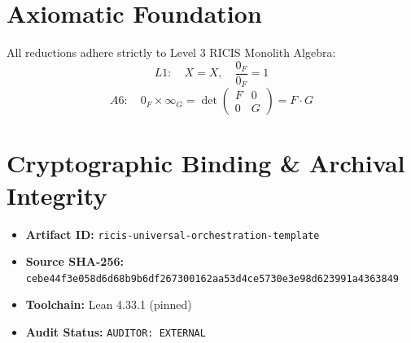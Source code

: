 \documentclass[11pt,a4paper]{article}
\begin{document}
\section{Axiomatic Foundation}
All reductions adhere strictly to Level 3 RICIS Monolith Algebra:
\begin{equation}
L1: \quad X = X, \quad \frac{0_F}{0_F} = 1
\end{equation}
\begin{equation}
A6: \quad 0_F \times \infty_G = \det\begin{pmatrix} F & 0 \\ 0 & G \end{pmatrix} = F \cdot G
\end{equation}

\section{Cryptographic Binding & Archival Integrity}
\begin{itemize}
  \item \textbf{Artifact ID:} \texttt{ricis-universal-orchestration-template}
  \item \textbf{Source SHA-256:} \texttt{cebe44f3e058d6d68b9b6df267300162aa53d4ce5730e3e98d623991a4363849}
  \item \textbf{Toolchain:} Lean 4.33.1 (pinned)
  \item \textbf{Audit Status:} \texttt{AUDITOR: EXTERNAL}
\end{itemize}
\end{document}

